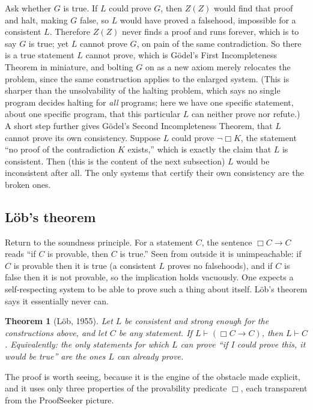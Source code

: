 \documentclass[10pt]{article}
\newtheorem{theorem}{Theorem}[section]
\theoremstyle{definition}
\theoremstyle{remark}
\newcommand{\prov}{\vdash}            %
\newcommand{\Prov}{\Box}              %
\newcommand{\PS}{\mathrm{ProofSeeker}}
\begin{document}
Ask whether $G$ is true. If $L$ could prove $G$, then $Z(Z)$ would find that proof and halt, making $G$ false, so $L$ would have proved a falsehood, impossible for a consistent $L$. Therefore $Z(Z)$ never finds a proof and runs forever, which is to say $G$ is true; yet $L$ cannot prove $G$, on pain of the same contradiction. So there is a true statement $L$ cannot prove, which is G\"odel's First Incompleteness Theorem in miniature, and bolting $G$ on as a new axiom merely relocates the problem, since the same construction applies to the enlarged system. (This is sharper than the unsolvability of the halting problem, which says no single program decides halting for \emph{all} programs; here we have one specific statement, about one specific program, that this particular $L$ can neither prove nor refute.) A short step further gives G\"odel's Second Incompleteness Theorem, that $L$ cannot prove its own consistency. Suppose $L$ could prove $\neg \Prov K$, the statement ``no proof of the contradiction $K$ exists,'' which is exactly the claim that $L$ is consistent. Then (this is the content of the next subsection) $L$ would be inconsistent after all. The only systems that certify their own consistency are the broken ones.

\subsection{L\"ob's theorem}
\label{sec:lob}

Return to the soundness principle. For a statement $C$, the sentence $\Prov C \to C$ reads ``if $C$ is provable, then $C$ is true.'' Seen from outside it is unimpeachable: if $C$ is provable then it is true (a consistent $L$ proves no falsehoods), and if $C$ is false then it is not provable, so the implication holds vacuously. One expects a self-respecting system to be able to prove such a thing about itself. L\"ob's theorem says it essentially never can.

\begin{theorem}[L\"ob, 1955]
\label{thm:lob}
Let $L$ be consistent and strong enough for the constructions above, and let $C$ be any statement. If $L \prov (\Prov C \to C)$, then $L \prov C$. Equivalently: the only statements for which $L$ can prove ``if I could prove this, it would be true'' are the ones $L$ can already prove.
\end{theorem}

The proof is worth seeing, because it is the engine of the obstacle made explicit, and it uses only three properties of the provability predicate $\Prov$, each transparent from the $\PS$ picture.
\end{document}
